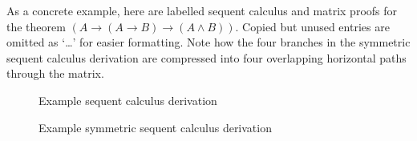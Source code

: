 \documentclass[twoside]{report}
\begin{document}
As a concrete example, here are labelled sequent calculus and matrix proofs for the theorem $(A \to (A \to B) \to (A \land B))$. Copied but unused entries are omitted as `\ldots' for easier formatting. Note how the four branches in the symmetric sequent calculus derivation are compressed into four overlapping horizontal paths through the matrix.

\begin{figure}[ht]
    \centering
\caption{Example sequent calculus derivation}
\label{fig:example_sequent_calculus}
\end{figure}

\begin{figure}[ht]
    \centering
\caption{Example symmetric sequent calculus derivation}
\label{fig:example_symmetric_sequent_calculus}
\end{figure}
\end{document}
